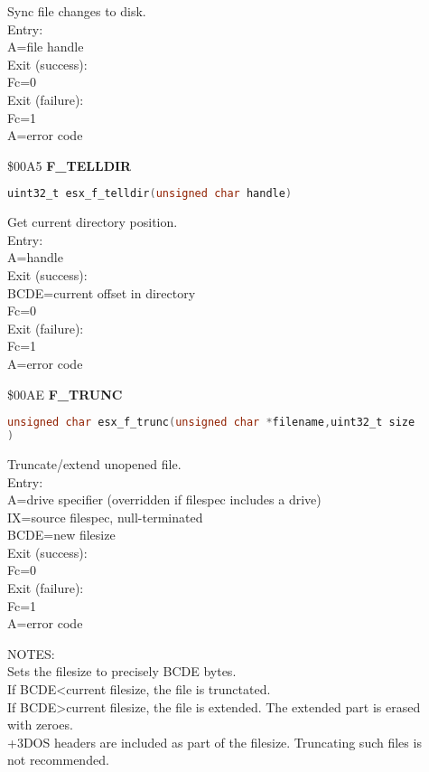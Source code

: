 Sync file changes to disk.\\
Entry:\\
A=file handle\\
Exit (success):\\
Fc=0\\
Exit (failure):\\
Fc=1\\
A=error code

\$00A5 \textbf{F\_TELLDIR}

\begin{lstlisting}[language=C]
uint32_t esx_f_telldir(unsigned char handle)
\end{lstlisting}

Get current directory position.\\
Entry:\\
A=handle\\
Exit (success):\\
BCDE=current offset in directory\\
Fc=0\\
Exit (failure):\\
Fc=1\\
A=error code

\$00AE \textbf{F\_TRUNC}

\begin{lstlisting}[language=C]
unsigned char esx_f_trunc(unsigned char *filename,uint32_t size
)
\end{lstlisting}

Truncate/extend unopened file.\\
Entry:\\
A=drive specifier (overridden if filespec includes a drive)\\
IX=source filespec, null-terminated\\
BCDE=new filesize\\
Exit (success):\\
Fc=0\\
Exit (failure):\\
Fc=1\\
A=error code

NOTES:\\
Sets the filesize to precisely BCDE bytes.\\
If BCDE<current filesize, the file is trunctated.\\
If BCDE>current filesize, the file is extended. The extended part is erased\\
with zeroes.\\
+3DOS headers are included as part of the filesize. Truncating such files is\\
not recommended.

